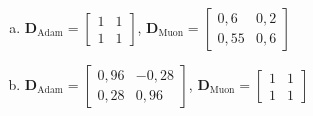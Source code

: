 \documentclass{dlproblemset}
\begin{document}
\begin{enumerate}[1)]
\begin{enumerate}[(a)]
        \item $\mathbf{D}_{\text{Adam}} = \begin{bmatrix} 1 & 1 \\ 1 & 1 \end{bmatrix}$, \quad $\mathbf{D}_{\text{Muon}} = \begin{bmatrix} 0{,}6 & 0{,}2 \\ 0{,}55 & 0{,}6 \end{bmatrix}$
        \item $\mathbf{D}_{\text{Adam}} = \begin{bmatrix} 0{,}96 & -0{,}28 \\ 0{,}28 & 0{,}96 \end{bmatrix}$, \quad $\mathbf{D}_{\text{Muon}} = \begin{bmatrix} 1 & 1 \\ 1 & 1 \end{bmatrix}$
    \end{enumerate}

\end{enumerate}

\newpage
\end{document}
